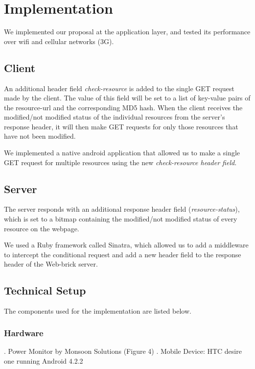 \documentclass{sigplanconf}
\begin{document}
\section{Implementation}

We implemented our proposal at the application layer, and tested its performance over wifi and cellular networks (3G).

\subsection{Client}

An additional header field {\it check-resource} is added to the single GET request made by the client. The value of this field will be set to a list of key-value pairs of the resource-url and the corresponding MD5 hash. When the client receives the modified/not modified status of the individual resources from the server's response header, it will then make GET requests for only those resources that have not been modified.

We implemented a native android application that allowed us to make a single GET request for multiple resources using the new \it{check-resource} \rm header field.

\subsection{Server}

The server responds with an additional response header field ({\it resource-status}),  which is set to a bitmap containing the modified/not modified status of every resource on the webpage. 

We used a Ruby framework called Sinatra, which allowed us to add a middleware to intercept the conditional request and add a new header field to the response header of the Web-brick server.

\subsection{Technical Setup}
The components used for the implementation are listed below.

\subsubsection{Hardware}

. Power Monitor by Monsoon Solutions (Figure 4) . Mobile Device: HTC desire one running Android 4.2.2
\end{document}
